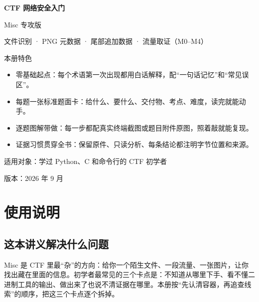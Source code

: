 \documentclass[UTF8,12pt,oneside]{ctexbook}
\begin{document}
\frontmatter
\begin{titlepage}
\centering
\vspace*{36mm}
{\Huge\bfseries CTF 网络安全入门\par}
\vspace{9mm}
{\LARGE Misc 专攻版\par}
\vspace{5mm}
{\large 文件识别 · PNG 元数据 · 尾部追加数据 · 流量取证（M0--M4）\par}
\vspace{14mm}
{\large 本册特色\par}
\vspace{3mm}
\begin{minipage}{0.86\textwidth}
\small
\begin{itemize}
\item 零基础起点：每个术语第一次出现都用白话解释，配“一句话记忆”和“常见误区”。
\item 每题一张标准题面卡：给什么、要什么、交付物、考点、难度，读完就能动手。
\item 逐题图解带做：每一步都配真实终端截图或题目附件原图，照着敲就能复现。
\item 证据习惯贯穿全书：保留原件、只读分析、每条结论都注明字节位置和来源。
\end{itemize}
\end{minipage}
\vspace{12mm}
{\large 适用对象：学过 Python、C 和命令行的 CTF 初学者\par}
\vspace{4mm}
{\large 版本：2026 年 9 月\par}
\end{titlepage}

\chapter*{使用说明}

\section*{这本讲义解决什么问题}
Misc 是 CTF 里最“杂”的方向：给你一个陌生文件、一段流量、一张图片，让你找出藏在里面的信息。初学者最常见的三个卡点是：不知道从哪里下手、看不懂二进制工具的输出、做出来了也说不清证据在哪里。本册按“先认清容器，再追查线索”的顺序，把这三个卡点逐个拆掉。
\end{document}
